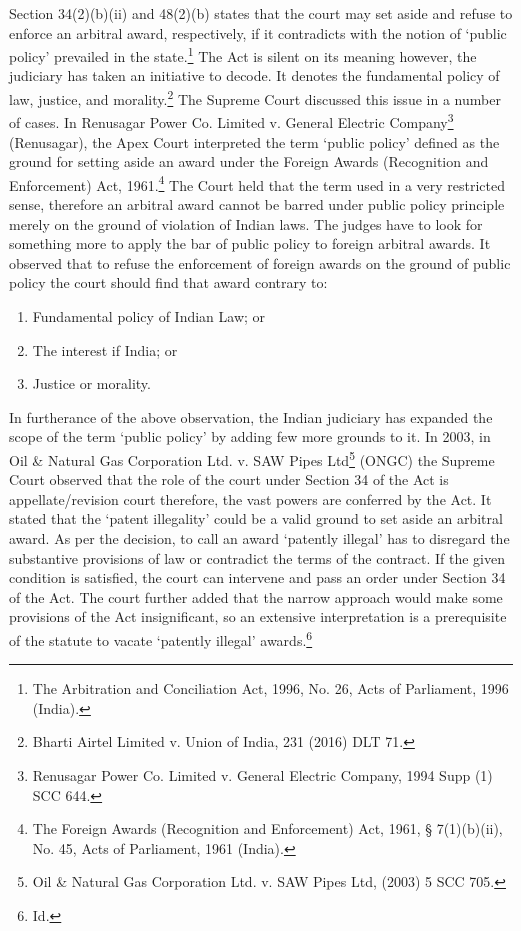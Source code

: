 \begin{multicols}{2}

\noi
Section 34(2)(b)(ii) and 48(2)(b) states that the court may set aside and refuse to enforce an
arbitral award, respectively, if it contradicts with the notion of ‘public policy’ prevailed in the
state.\footnote{The Arbitration and Conciliation Act, 1996, No. 26, Acts of Parliament, 1996 (India).} The Act is silent on its meaning however, the judiciary has taken an initiative to decode. It denotes the fundamental policy of law, justice, and morality.\footnote{Bharti Airtel Limited v. Union of India, 231 (2016) DLT 71.} The Supreme Court
discussed this issue in a number of cases. In Renusagar Power Co. Limited v. General Electric
Company\footnote{Renusagar Power Co. Limited v. General Electric Company, 1994 Supp (1) SCC 644.} (Renusagar), the Apex Court interpreted the term ‘public policy’ defined as the
ground for setting aside an award under the Foreign Awards (Recognition and Enforcement)
Act, 1961.\footnote{The Foreign Awards (Recognition and Enforcement) Act, 1961, § 7(1)(b)(ii), No. 45, Acts of Parliament, 1961 (India).} The Court held that the term used in a very restricted sense, therefore an arbitral award cannot be barred under public policy principle merely on the ground of violation of Indian laws. The judges have to look for something more to apply the bar of public policy to
foreign arbitral awards. It observed that to refuse the enforcement of foreign awards on the
ground of public policy the court should find that award contrary to:

\begin{enumerate}[label=$(\alph*)$]
\item Fundamental policy of Indian Law; or

\item The interest if India; or

\item Justice or morality.
\end{enumerate}

\noi
In furtherance of the above observation, the Indian judiciary has expanded the scope of the
term ‘public policy’ by adding few more grounds to it. In 2003, in Oil \& Natural Gas
Corporation Ltd. v. SAW Pipes Ltd\footnote{Oil \& Natural Gas Corporation Ltd. v. SAW Pipes Ltd, (2003) 5 SCC 705.} (ONGC) the Supreme Court observed that the role of
the court under Section 34 of the Act is appellate/revision court therefore, the vast powers are
conferred by the Act. It stated that the ‘patent illegality’ could be a valid ground to set aside
an arbitral award. As per the decision, to call an award ‘patently illegal’ has to disregard the
substantive provisions of law or contradict the terms of the contract. If the given condition is
satisfied, the court can intervene and pass an order under Section 34 of the Act. The court
further added that the narrow approach would make some provisions of the Act insignificant,
so an extensive interpretation is a prerequisite of the statute to vacate ‘patently illegal’
awards.\footnote{Id.}


\end{multicols}

